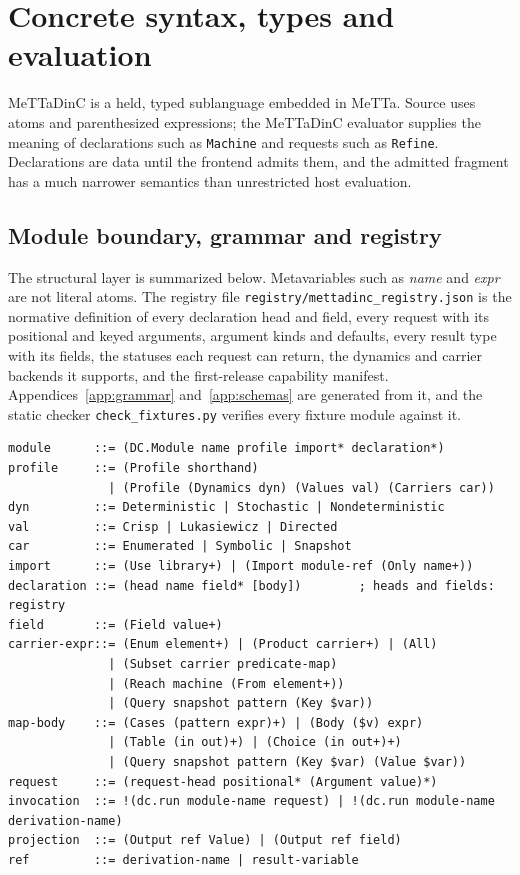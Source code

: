 \documentclass[11pt]{article}
\newcommand{\code}[1]{\texttt{#1}}
\theoremstyle{definition}
\theoremstyle{plain}
\begin{document}
\section{Concrete syntax, types and evaluation}\label{sec:syntax}

MeTTaDinC is a held, typed sublanguage embedded in MeTTa. Source uses atoms and parenthesized
expressions; the MeTTaDinC evaluator supplies the meaning of declarations such as \code{Machine} and
requests such as \code{Refine}. Declarations are data until the frontend admits them, and the
admitted fragment has a much narrower semantics than unrestricted host evaluation.

\subsection{Module boundary, grammar and registry}

The structural layer is summarized below. Metavariables such as \emph{name} and \emph{expr} are not
literal atoms. The registry file \code{registry/mettadinc\_registry.json} is the normative definition of
every declaration head and field, every request with its positional and keyed arguments, argument
kinds and defaults, every result type with its fields, the statuses each request can return, the
dynamics and carrier backends it supports, and the first-release capability manifest.
Appendices~\ref{app:grammar} and~\ref{app:schemas} are generated from it, and the static checker
\code{check\_fixtures.py} verifies every fixture module against it.

\begin{lstlisting}
module      ::= (DC.Module name profile import* declaration*)
profile     ::= (Profile shorthand)
              | (Profile (Dynamics dyn) (Values val) (Carriers car))
dyn         ::= Deterministic | Stochastic | Nondeterministic
val         ::= Crisp | Lukasiewicz | Directed
car         ::= Enumerated | Symbolic | Snapshot
import      ::= (Use library+) | (Import module-ref (Only name+))
declaration ::= (head name field* [body])        ; heads and fields: registry
field       ::= (Field value+)
carrier-expr::= (Enum element+) | (Product carrier+) | (All)
              | (Subset carrier predicate-map)
              | (Reach machine (From element+))
              | (Query snapshot pattern (Key $var))
map-body    ::= (Cases (pattern expr)+) | (Body ($v) expr)
              | (Table (in out)+) | (Choice (in out+)+)
              | (Query snapshot pattern (Key $var) (Value $var))
request     ::= (request-head positional* (Argument value)*)
invocation  ::= !(dc.run module-name request) | !(dc.run module-name derivation-name)
projection  ::= (Output ref Value) | (Output ref field)
ref         ::= derivation-name | result-variable
\end{lstlisting}
\end{document}
